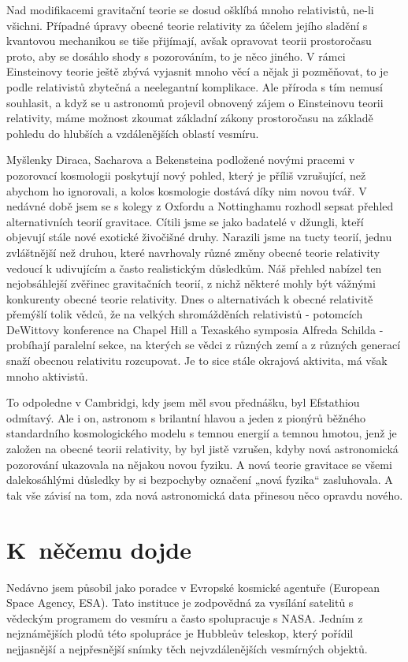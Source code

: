  Nad modifikacemi gravitační teorie se dosud ošklíbá mnoho relativistů, ne-li všichni. Případné
  úpravy obecné teorie relativity za účelem jejího sladění s kvantovou mechanikou se tiše přijímají,
  avšak opravovat teorii prostoročasu proto, aby se dosáhlo shody s pozorováním, to je něco jiného.
  V rámci Einsteinovy teorie ještě zbývá vyjasnit mnoho věcí a nějak ji pozměňovat, to je podle
  relativistů zbytečná a neelegantní komplikace. Ale příroda s tím nemusí souhlasit, a když se u
  astronomů projevil obnovený zájem o Einsteinovu teorii relativity, máme možnost zkoumat základní
  zákony prostoročasu na základě pohledu do hlubších a vzdálenějších oblastí vesmíru. 
  
  Myšlenky Diraca, Sacharova a Bekensteina podložené novými pracemi v pozorovací kosmologii
  poskytují nový pohled, který je příliš vzrušující, než abychom ho ignorovali, a kolos kosmologie
  dostává díky nim novou tvář. V nedávné době jsem se s kolegy z Oxfordu a Nottinghamu rozhodl
  sepsat přehled alternativních teorií gravitace. Cítili jsme se jako badatelé v džungli, kteří
  objevují stále nové exotické živočišné druhy. Narazili jsme na tucty teorií, jednu zvláštnější než
  druhou, které navrhovaly různé změny obecné teorie relativity vedoucí k udivujícím a často
  realistickým důsledkům. Náš přehled nabízel ten nejobsáhlejší zvěřinec gravitačních teorií, z
  nichž některé mohly být vážnými konkurenty obecné teorie relativity. Dnes o alternativách k obecné
  relativitě přemýšlí tolik vědců, že na velkých shromážděních relativistů - potomcích DeWittovy
  konference na Chapel Hill a Texaského symposia Alfreda Schilda - probíhají paralelní sekce, na
  kterých se vědci z různých zemí a z různých generací snaží obecnou relativitu rozcupovat. Je to
  sice stále okrajová aktivita, má však mnoho aktivistů. 
  
  To odpoledne v Cambridgi, kdy jsem měl svou přednášku, byl Efstathiou odmítavý. Ale i on, astronom
  s brilantní hlavou a jeden z pionýrů běžného standardního kosmologického modelu s temnou energií a
  temnou hmotou, jenž je založen na obecné teorii relativity, by byl jistě vzrušen, kdyby nová
  astronomická pozorování ukazovala na nějakou novou fyziku. A nová teorie gravitace se všemi
  dalekosáhlými důsledky by si bezpochyby označení „nová fyzika“ zasluhovala. A tak vše závisí na
  tom, zda nová astronomická data přinesou něco opravdu nového.

\section{K něčemu dojde}\label{feyIchIIIsecXV}
  Nedávno jsem působil jako poradce v Evropské kosmické agentuře (European Space Agency, ESA). Tato
  instituce je zodpovědná za vysílání satelitů s vědeckým programem do vesmíru a často spolupracuje
  s NASA. Jedním z nejznámějších plodů této spolupráce je Hubbleův teleskop, který pořídil
  nejjasnější a nejpřesnější snímky těch nejvzdálenějších vesmírných objektů. 
  
